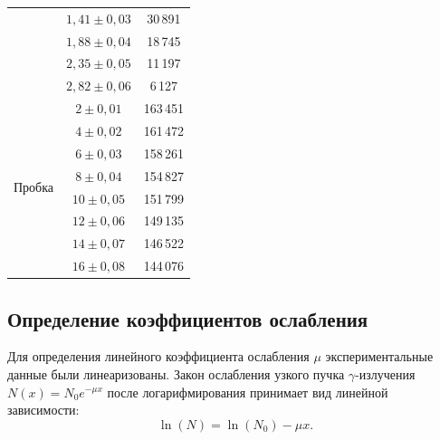 \documentclass[12pt,a4paper]{article}
\begin{document}
\begin{table}[h!]
\begin{tabular}{|c|c|c|}
                                & $1{,}41 \pm 0{,}03$ & 30\,891 \\
                                & $1{,}88 \pm 0{,}04$ & 18\,745 \\
                                & $2{,}35 \pm 0{,}05$ & 11\,197 \\
                                & $2{,}82 \pm 0{,}06$ & 6\,127 \\
\hline
\multirow{8}{*}{Пробка}         & $2 \pm 0{,}01$   & 163\,451 \\
                                & $4 \pm 0{,}02$   & 161\,472 \\
                                & $6 \pm 0{,}03$   & 158\,261 \\
                                & $8 \pm 0{,}04$   & 154\,827 \\
                                & $10 \pm 0{,}05$  & 151\,799 \\
                                & $12 \pm 0{,}06$  & 149\,135 \\
                                & $14 \pm 0{,}07$  & 146\,522 \\
                                & $16 \pm 0{,}08$  & 144\,076 \\
\hline
\end{tabular}
\end{table}

\vspace{0.5cm}













\newpage
\subsection*{Определение коэффициентов ослабления}

Для определения линейного коэффициента ослабления $\mu$ экспериментальные данные были линеаризованы. Закон ослабления узкого пучка $\gamma$-излучения $N(x) = N_0 e^{-\mu x}$ после логарифмирования принимает вид линейной зависимости:
\begin{equation}
    \ln(N) = \ln(N_0) - \mu x.
\end{equation}
\end{document}
